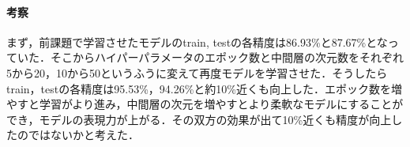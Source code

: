 \documentclass[11pt, a4paper]{jsarticle}
\begin{document}
  \paragraph{ 考察}
  まず，前課題で学習させたモデルのtrain, testの各精度は86.93\%と87.67\%となっていた．そこからハイパーパラメータのエポック数と中間層の次元数をそれぞれ5から20，10から50というふうに変えて再度モデルを学習させた．そうしたらtrain，testの各精度は95.53\%，94.26\%と約10\%近くも向上した．エポック数を増やすと学習がより進み，中間層の次元を増やすとより柔軟なモデルにすることができ，モデルの表現力が上がる．その双方の効果が出て10\%近くも精度が向上したのではないかと考えた．
\end{document}
